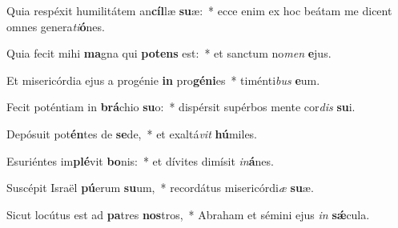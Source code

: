 \item Quia respéxit humilitátem an\textbf{cíl}læ \textbf{su}æ:~* ecce enim ex hoc beátam me dicent omnes genera\textit{ti}\textbf{ó}nes.
\item Quia fecit mihi \textbf{ma}gna qui \textbf{pot}\textbf{ens} est:~* et sanctum no\textit{men} \textbf{e}jus.
\item Et misericórdia ejus a progénie \textbf{in} pro\textbf{gé}\textbf{ni}es~* timénti\textit{bus} \textbf{e}um.
\item Fecit poténtiam in \textbf{brá}chio \textbf{su}o:~* dispérsit supérbos mente cor\textit{dis} \textbf{su}i.
\item Depósuit pot\textbf{én}tes de \textbf{se}de,~* et exaltá\textit{vit} \textbf{hú}miles.
\item Esuriéntes im\textbf{plé}vit \textbf{bo}nis:~* et dívites dimísit \textit{in}\textbf{á}nes.
\item Suscépit Israël \textbf{pú}erum \textbf{su}um,~* recordátus misericórdi\textit{æ} \textbf{su}æ.
\item Sicut locútus est ad \textbf{pa}tres \textbf{nos}tros,~* Abraham et sémini ejus \textit{in} \textbf{sǽ}cula.
